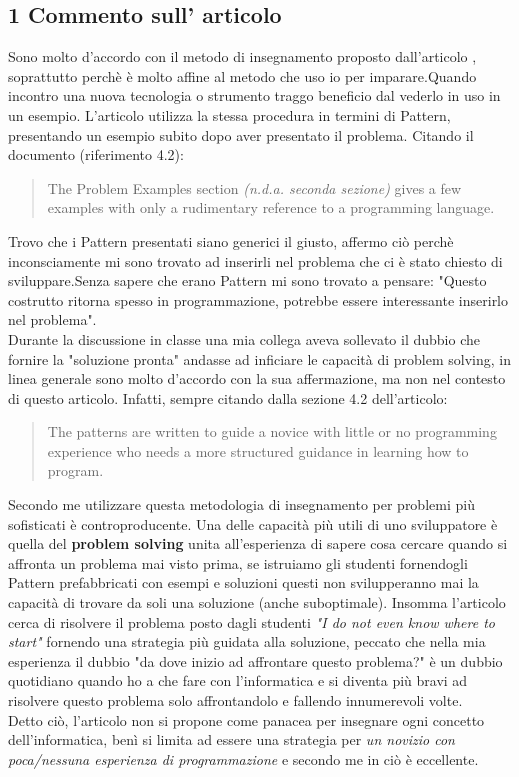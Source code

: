 \documentclass[a4paper]{article}
\begin{document}
\subsection{1 Commento sull' articolo}
Sono molto d'accordo con il metodo di insegnamento proposto dall'articolo \cite{articolo}, soprattutto perchè è molto affine al metodo che uso io per imparare.Quando incontro una nuova tecnologia o strumento traggo beneficio dal vederlo in uso in un esempio.
L'articolo \cite{articolo} utilizza la stessa procedura in termini di Pattern, presentando un esempio subito dopo aver presentato il problema.
Citando il documento (riferimento 4.2): \begin{quote} The Problem Examples section \textit{(n.d.a. seconda sezione)} gives a few examples with only a rudimentary reference to a programming language.\end{quote}
Trovo che i Pattern presentati siano generici il giusto, affermo ciò perchè inconsciamente mi sono trovato ad inserirli nel problema che ci è stato chiesto di sviluppare.Senza sapere che erano Pattern mi sono trovato a pensare: "Questo costrutto ritorna spesso in programmazione, potrebbe essere interessante inserirlo nel problema".\\ 
Durante la discussione in classe una mia collega aveva sollevato il dubbio che fornire la "soluzione pronta" andasse ad inficiare le capacità di problem solving, in linea generale sono molto d'accordo con la sua affermazione, ma non nel contesto di questo articolo. Infatti, sempre citando dalla sezione 4.2 dell'articolo:
\begin{quote} The patterns are written to guide a novice with little or no programming experience who needs a more structured guidance in learning how to program.\end{quote}
Secondo me utilizzare questa metodologia di insegnamento per problemi più sofisticati è controproducente.
Una delle capacità più utili di uno sviluppatore è quella del \textbf{problem solving} unita all'esperienza di sapere cosa cercare quando si affronta un problema mai visto prima, se istruiamo gli studenti fornendogli Pattern prefabbricati con esempi e soluzioni questi non svilupperanno mai la capacità di trovare da soli una soluzione (anche suboptimale).
Insomma l'articolo cerca di risolvere il problema posto dagli studenti \textit{"I do not even know where to start"} fornendo una strategia più guidata alla soluzione, peccato che nella mia esperienza il dubbio "da dove inizio ad affrontare questo problema?" è un dubbio quotidiano quando ho a che fare con l'informatica e si diventa più bravi ad risolvere questo problema solo affrontandolo e fallendo innumerevoli volte.\\
Detto ciò, l'articolo \cite{articolo} non si propone come panacea per insegnare ogni concetto dell'informatica, benì si limita ad essere una strategia per \textit{un novizio con poca/nessuna esperienza di programmazione} e secondo me in ciò è eccellente.
\end{document}
